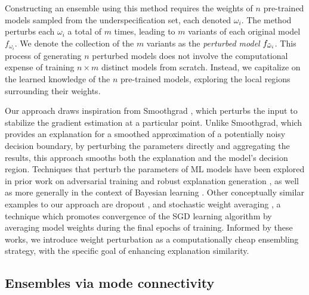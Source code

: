 Constructing an ensemble using this method requires the weights of $n$ pre-trained models sampled from the underspecification set, each denoted $\omega_i$. The method perturbs each $\omega_i$ a total of $m$ times, leading to $m$ variants of each original model $f_{\omega_i}$. We denote the collection of the $m$ variants as the \textit{perturbed model} $f_{\Tilde{\omega}_i}$. This process of generating $n$ perturbed models does not involve the computational expense of training $n \times m$ distinct models from scratch. Instead, we capitalize on the learned knowledge of the $n$ pre-trained models, exploring the local regions surrounding their weights.

Our approach draws inspiration from Smoothgrad \citep{smoothgrad2017}, which perturbs the input to stabilize the gradient estimation at a particular point. Unlike Smoothgrad, which provides an explanation for a smoothed approximation of a potentially noisy decision boundary, by perturbing the parameters directly and aggregating the results, this approach smooths both the explanation and the model's decision region. Techniques that perturb the parameters of ML models have been explored in prior work on adversarial training \citep{wu2020} and robust explanation generation \citep{upadhyay2021}, as well as more generally in the context of Bayesian learning \citep{gal2016, mackay1992}. Other conceptually similar examples to our approach are dropout \citep{srivastava2014}, and stochastic weight averaging \citep{izmailov2018}, a technique which promotes convergence of the SGD learning algorithm by averaging model weights during the final epochs of training. Informed by these works, we introduce weight perturbation as a computationally cheap ensembling strategy, with the specific goal of enhancing explanation similarity.


\subsection{Ensembles via mode connectivity}
\label{subsec:ensembles_mode}

